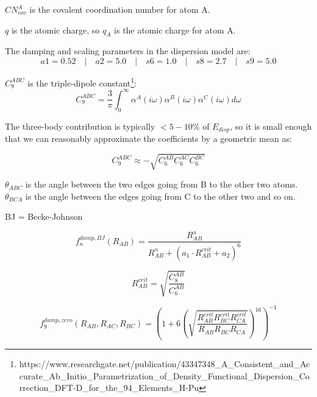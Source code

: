 \documentclass{article}
\makeatletter
\newcommand\footnoteref[1]{\protected@xdef\@thefnmark{\ref{#1}}\@footnotemark}
\makeatother
\begin{document}
\vspace{20pt}
\noindent
\(CN^A_{cov}\) is the covalent coordination number for atom A.

\vspace{10pt}
\noindent
\(q\) is the atomic charge, so \(q_A\) is the atomic charge for atom A.

\vspace{10pt}
\noindent
The damping and scaling parameters in the
dispersion model are:
\[
  a1 = 0.52 \quad|\quad a2 = 5.0 \quad|\quad s6 = 1.0 \quad|\quad s8 = 2.7 \quad|\quad s9 = 5.0
\]


\vspace{10pt}
\noindent
\(C_9^{ABC}\) is the triple-dipole constant\footnote{\label{dft-d}https://www.researchgate.net/publication/43347348\_A\_Consistent\_and\_Accurate\_Ab\_Initio\_Parametrization\_of\_Density\_Functional\_Dispersion\_Correction\_DFT-D\_for\_the\_94\_Elements\_H-Pu}:
\begin{equation}
  C_9^{ABC} = \frac{3}{\pi} \int_0^\infty \alpha^A(i\omega) \alpha^B(i\omega)\alpha^C(i\omega)d\omega
\end{equation}


\vspace{10pt}
\noindent
The three-body contribution is typically \(<5-10\%\) of \(E_{disp}\), so it is small enough that we can reasonably approximate the coefficients by a geometric mean as\footnoteref{dft-d}:

\begin{equation}
  C_9^{ABC} \approx -\sqrt{C_6^{AB} C_6^{AC} C_6^{BC}}
\end{equation}


\vspace{10pt}
\noindent
\(\theta_{ABC}\) is the angle between the two edges going from B to the other two atoms. \(\theta_{BCA}\) is the angle between the edges going from C to the other two and so on.


\vspace{10pt}
\noindent
BJ = Becke-Johnson

\begin{equation}
  f_n^{damp,BJ}(R_{AB}) = \frac{R_{AB}^n}{R_{AB}^n + (a_1 \cdot R_{AB}^{crit} + a_2)^6}
\end{equation}

\begin{equation}
  R_{AB}^{crit} = \sqrt{\frac{C_8^{AB}}{C_6^{AB}}}
\end{equation}


\begin{equation}
  f_9^{damp,zero}(R_{AB}, R_{AC}, R_{BC}) = \left(1 + 6 \left(\sqrt{\frac{R_{AB}^{crit} R_{BC}^{crit} R_{CA}^{crit}}{R_{AB} R_{BC} R_{CA}}}\right)^{16}\right)^{-1}
\end{equation}
\end{document}
